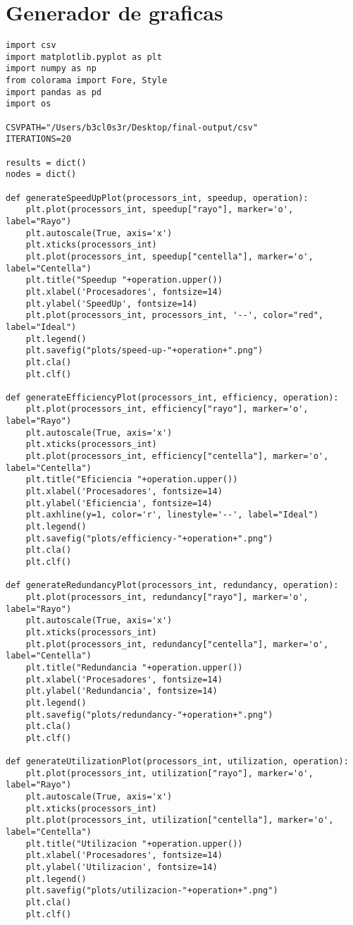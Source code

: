 \section{Generador de graficas}
\label{Apendice3:XXX}
\begin{center}
\begin{footnotesize}
\begin{verbatim}
import csv
import matplotlib.pyplot as plt
import numpy as np
from colorama import Fore, Style
import pandas as pd
import os 

CSVPATH="/Users/b3cl0s3r/Desktop/final-output/csv"
ITERATIONS=20

results = dict()
nodes = dict()

def generateSpeedUpPlot(processors_int, speedup, operation): 
    plt.plot(processors_int, speedup["rayo"], marker='o', label="Rayo")
    plt.autoscale(True, axis='x')
    plt.xticks(processors_int)
    plt.plot(processors_int, speedup["centella"], marker='o', label="Centella")
    plt.title("Speedup "+operation.upper())
    plt.xlabel('Procesadores', fontsize=14)
    plt.ylabel('SpeedUp', fontsize=14)
    plt.plot(processors_int, processors_int, '--', color="red", label="Ideal")
    plt.legend()
    plt.savefig("plots/speed-up-"+operation+".png")
    plt.cla()
    plt.clf()

def generateEfficiencyPlot(processors_int, efficiency, operation): 
    plt.plot(processors_int, efficiency["rayo"], marker='o', label="Rayo")
    plt.autoscale(True, axis='x')
    plt.xticks(processors_int)
    plt.plot(processors_int, efficiency["centella"], marker='o', label="Centella")
    plt.title("Eficiencia "+operation.upper())
    plt.xlabel('Procesadores', fontsize=14)
    plt.ylabel('Eficiencia', fontsize=14)
    plt.axhline(y=1, color='r', linestyle='--', label="Ideal")
    plt.legend()
    plt.savefig("plots/efficiency-"+operation+".png")
    plt.cla()
    plt.clf()

def generateRedundancyPlot(processors_int, redundancy, operation): 
    plt.plot(processors_int, redundancy["rayo"], marker='o', label="Rayo")
    plt.autoscale(True, axis='x')
    plt.xticks(processors_int)
    plt.plot(processors_int, redundancy["centella"], marker='o', label="Centella")
    plt.title("Redundancia "+operation.upper())
    plt.xlabel('Procesadores', fontsize=14)
    plt.ylabel('Redundancia', fontsize=14)
    plt.legend()
    plt.savefig("plots/redundancy-"+operation+".png")
    plt.cla()
    plt.clf()
    
def generateUtilizationPlot(processors_int, utilization, operation): 
    plt.plot(processors_int, utilization["rayo"], marker='o', label="Rayo")
    plt.autoscale(True, axis='x')
    plt.xticks(processors_int)
    plt.plot(processors_int, utilization["centella"], marker='o', label="Centella")
    plt.title("Utilizacion "+operation.upper())
    plt.xlabel('Procesadores', fontsize=14)
    plt.ylabel('Utilizacion', fontsize=14)
    plt.legend()
    plt.savefig("plots/utilizacion-"+operation+".png")
    plt.cla()
    plt.clf()


\end{verbatim}
\end{footnotesize}
\end{center}
